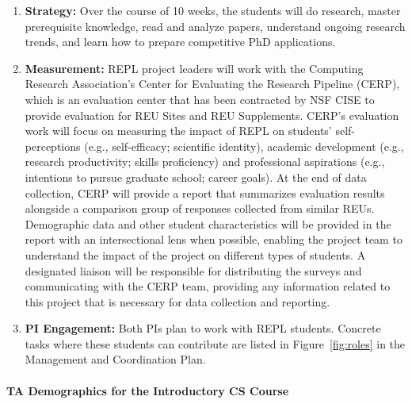 \begin{enumerate}
\item {\bf Strategy:} Over the course of 10 weeks, the students will do
research, master prerequisite knowledge, read and analyze papers, understand
ongoing research trends, and learn how to prepare competitive PhD applications.
\item {\bf Measurement:}
REPL project leaders will work with the Computing Research Association’s Center for Evaluating the Research Pipeline (CERP), which is an evaluation center that has been contracted by NSF CISE to provide evaluation for REU Sites and REU Supplements. CERP’s evaluation work will focus on measuring the impact of REPL on students’ self-perceptions (e.g., self-efficacy; scientific identity), academic development (e.g., research productivity; skills proficiency) and professional aspirations (e.g., intentions to pursue graduate school; career goals). At the end of data collection, CERP will provide a report that summarizes evaluation results alongside a comparison group of responses collected from similar REUs. Demographic data and other student characteristics will be provided in the report with an intersectional lens when possible, enabling the project team to understand the impact of the project on different types of students. A designated liaison will be responsible for distributing the surveys and communicating with the CERP team, providing any information related to this project that is necessary for data collection and reporting.
\item {\bf PI Engagement:} Both PIs plan to work with REPL students.
Concrete tasks where these students can contribute are listed in
Figure~\ref{fig:roles} in the Management and Coordination Plan.

\end{enumerate}


\paragraph*{TA Demographics for the Introductory CS Course}

